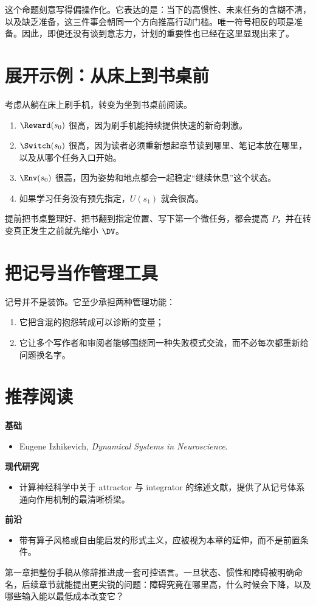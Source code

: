 \begin{discussion}
这个命题刻意写得偏操作化。它表达的是：当下的高惯性、未来任务的含糊不清，以及缺乏准备，这三件事会朝同一个方向推高行动门槛。唯一符号相反的项是准备。因此，即便还没有谈到意志力，计划的重要性也已经在这里显现出来了。
\end{discussion}

\section{展开示例：从床上到书桌前}

\begin{example}[一个最小状态转变]
考虑从躺在床上刷手机，转变为坐到书桌前阅读。
\begin{enumerate}[nosep]
  \item $\Reward(s_0)$ 很高，因为刷手机能持续提供快速的新奇刺激。
  \item $\Switch(s_0)$ 很高，因为读者必须重新想起章节读到哪里、笔记本放在哪里，以及从哪个任务入口开始。
  \item $\Env(s_0)$ 很高，因为姿势和地点都会一起稳定“继续休息”这个状态。
  \item 如果学习任务没有预先指定，$U(s_1)$ 就会很高。
\end{enumerate}
提前把书桌整理好、把书翻到指定位置、写下第一个微任务，都会提高 $P$，并在转变真正发生之前就先缩小 $\DV$。
\end{example}

\section{把记号当作管理工具}

记号并不是装饰。它至少承担两种管理功能：
\begin{enumerate}[nosep]
  \item 它把含混的抱怨转成可以诊断的变量；
  \item 它让多个写作者和审阅者能够围绕同一种失败模式交流，而不必每次都重新给问题换名字。
\end{enumerate}

\section{推荐阅读}

\begin{readingbox}
\textbf{基础}
\begin{itemize}[nosep]
  \item Eugene Izhikevich, \emph{Dynamical Systems in Neuroscience}.
\end{itemize}
\textbf{现代研究}
\begin{itemize}[nosep]
  \item 计算神经科学中关于 attractor 与 integrator 的综述文献，提供了从记号体系通向作用机制的最清晰桥梁。
\end{itemize}
\textbf{前沿}
\begin{itemize}[nosep]
  \item 带有算子风格或自由能启发的形式主义，应被视为本章的延伸，而不是前置条件。
\end{itemize}
\end{readingbox}

\begin{summarybox}
第一章把整份手稿从修辞推进成一套可控语言。一旦状态、惯性和障碍被明确命名，后续章节就能提出更尖锐的问题：障碍究竟在哪里高，什么时候会下降，以及哪些输入能以最低成本改变它？
\end{summarybox}
